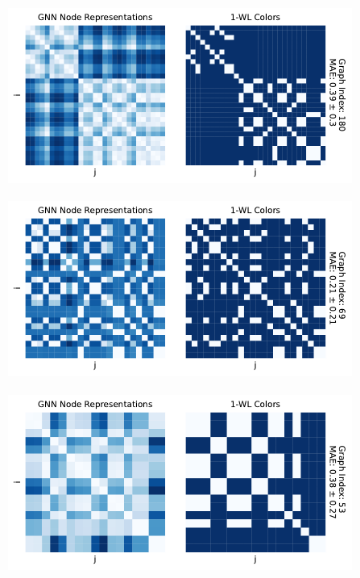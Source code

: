 \begin{figure}[!htb]
	\centering
	\begin{subfigure}[b]{0.49\textwidth}
		\centering
		\includegraphics[width=\textwidth]{Figures/heatmaps_ENZYMES_single.pdf}
		\vspace*{-5ex} 
        \caption{\enzymes}
	\end{subfigure}
	\hfill
	\begin{subfigure}[b]{0.49\textwidth}
		\centering
		\includegraphics[width=\textwidth]{Figures/heatmaps_IMDB-BINARY_single.pdf}
		\vspace*{-5ex} 
        \caption{\imdb}
	\end{subfigure}
	\par\bigskip
	\begin{subfigure}[b]{0.49\textwidth}
		\centering
		\includegraphics[width=\textwidth]{Figures/heatmaps_MUTAG_single.pdf}

\end{subfigure}
\end{figure}
